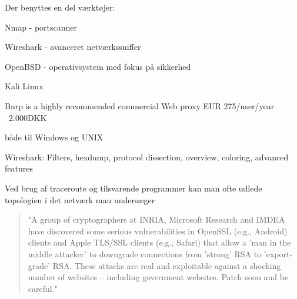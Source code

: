 \documentclass[20pt,landscape,a4paper]{foils}
\begin{document}
\begin{list1}
\item Der benyttes en del værktøjer:
\begin{list2}
\item Nmap -  portscanner
\item Wireshark -  avanceret netværkssniffer
\item OpenBSD -  operativsystem med fokus
  på sikkerhed
\item Kali Linux 
\item Burp is a highly recommended commercial Web proxy EUR 275/user/year ~2.000DKK\\
\end{list2}

\end{list1}







\centerline{}
\centerline{både til Windows og UNIX}


Wireshark: Filters, hexdump, protocol dissection, overview, coloring, advanced features





\begin{list1}
\item Ved brug af traceroute og tilsvarende programmer kan man ofte
  udlede topologien i det netværk man undersæger
\end{list1}










\begin{quote}
"A group of cryptographers at INRIA, Microsoft Research and IMDEA have discovered some serious vulnerabilities in OpenSSL (e.g., Android) clients and Apple TLS/SSL clients (e.g., Safari) that allow a 'man in the middle attacker' to downgrade connections from 'strong' RSA to 'export-grade' RSA. These attacks are real and exploitable against a shocking number of websites -- including government websites. Patch soon and be careful."
\end{quote}
\end{document}
